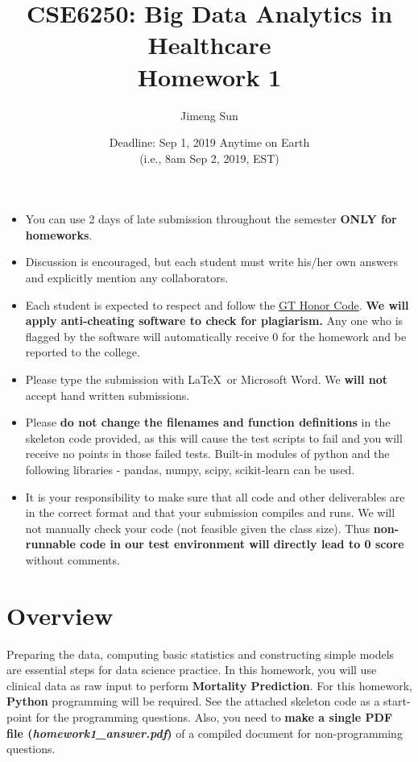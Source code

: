 \documentclass[12pt]{article}
\title{CSE6250: Big Data Analytics in Healthcare \\ Homework 1}
\author{Jimeng Sun}
\date{Deadline: Sep 1, 2019 Anytime on Earth\\ (i.e., 8am Sep 2, 2019, EST)}
\begin{document}
\maketitle
\begin{itemize}
\item You can use 2 days of late submission throughout the semester \textbf{ONLY for homeworks}.
\item Discussion is encouraged, but each student must write his/her own answers and explicitly mention any collaborators.
\item Each student is expected to respect and follow the \href{http://www.honor.gatech.edu/}{ GT Honor Code}. \textbf{We will apply anti-cheating software to check for plagiarism.} Any one who is flagged by the software will automatically receive 0 for the homework and be reported to the college.
\item Please type the submission with \LaTeX\ or Microsoft Word. We \textbf{will not} accept hand written submissions.
\item Please \textbf{do not change the filenames and function definitions} in the skeleton code provided, as this will cause the test scripts to fail and you will  receive no points in those failed tests. Built-in modules of python and the following libraries -  pandas, numpy, scipy, scikit-learn can be used. 
\item It is your responsibility to make sure that all code and other deliverables are in the correct format and that your submission compiles and runs. We will not manually check your code (not feasible given the class size). Thus \textbf{non-runnable code in our test environment will directly lead to 0 score} without comments.
\end{itemize}

\section*{Overview}

Preparing the data, computing basic statistics and constructing simple models are essential steps for  data science practice. In this homework, you will use clinical data as raw input to perform \textbf{Mortality Prediction}. For this homework, \textbf{Python} programming will be required. See the attached skeleton code as a start-point for the programming questions. Also, you need to \textbf{make a single PDF file (\textit{homework1\_answer.pdf}) }of a compiled document for non-programming questions.
\end{document}
